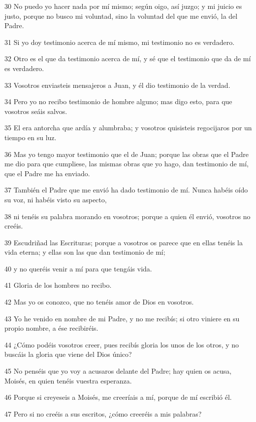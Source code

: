 \par 30 No puedo yo hacer nada por mí mismo; según oigo, así juzgo; y mi juicio es justo, porque no busco mi voluntad, sino la voluntad del que me envió, la del Padre.
\par 31 Si yo doy testimonio acerca de mí mismo, mi testimonio no es verdadero.
\par 32 Otro es el que da testimonio acerca de mí, y sé que el testimonio que da de mí es verdadero.
\par 33 Vosotros enviasteis mensajeros a Juan, y él dio testimonio de la verdad.
\par 34 Pero yo no recibo testimonio de hombre alguno; mas digo esto, para que vosotros seáis salvos.
\par 35 El era antorcha que ardía y alumbraba; y vosotros quisisteis regocijaros por un tiempo en su luz.
\par 36 Mas yo tengo mayor testimonio que el de Juan; porque las obras que el Padre me dio para que cumpliese, las mismas obras que yo hago, dan testimonio de mí, que el Padre me ha enviado.
\par 37 También el Padre que me envió ha dado testimonio de mí. Nunca habéis oído su voz, ni habéis visto su aspecto,
\par 38 ni tenéis su palabra morando en vosotros; porque a quien él envió, vosotros no creéis.
\par 39 Escudriñad las Escrituras; porque a vosotros os parece que en ellas tenéis la vida eterna; y ellas son las que dan testimonio de mí;
\par 40 y no queréis venir a mí para que tengáis vida.
\par 41 Gloria de los hombres no recibo.
\par 42 Mas yo os conozco, que no tenéis amor de Dios en vosotros.
\par 43 Yo he venido en nombre de mi Padre, y no me recibís; si otro viniere en su propio nombre, a ése recibiréis.
\par 44 ¿Cómo podéis vosotros creer, pues recibís gloria los unos de los otros, y no buscáis la gloria que viene del Dios único?
\par 45 No penséis que yo voy a acusaros delante del Padre; hay quien os acusa, Moisés, en quien tenéis vuestra esperanza.
\par 46 Porque si creyeseis a Moisés, me creeríais a mí, porque de mí escribió él.
\par 47 Pero si no creéis a sus escritos, ¿cómo creeréis a mis palabras?


